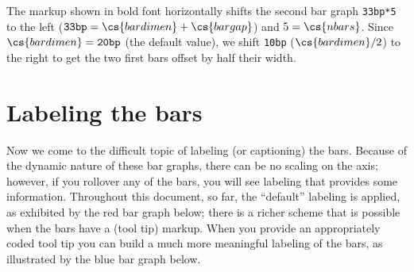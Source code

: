 \documentclass{article}
\begin{document}
The markup shown in bold font horizontally shifts the second bar graph
\texttt{33bp*5} to the left ($\texttt{33bp}=\cs{bardimen}+\cs{bargap}$) and
$5 = \cs{nbars} $. Since $\cs{bardimen}=\texttt{20bp}$ (the default value),
we shift \texttt{10bp} ($\cs{bardimen}/2$) to the right to get the two first
bars offset by half their width.

\section{Labeling the bars}\label{labelBars}

Now we come to the difficult topic of labeling (or captioning) the bars.
Because of the dynamic nature of these bar graphs, there can be no scaling on
the axis; however, if you rollover any of the bars, you will see labeling
that provides some information. Throughout this document, so far, the
``default'' labeling is applied, as exhibited by the red bar graph below;
there is a richer scheme that is possible when the bars have a  (tool
tip) markup. When you provide an appropriately coded tool tip you can build a
much more meaningful labeling of the bars, as illustrated by the blue bar
graph below.

\noindent
{}\vcgBdry[6pt]
\end{document}

